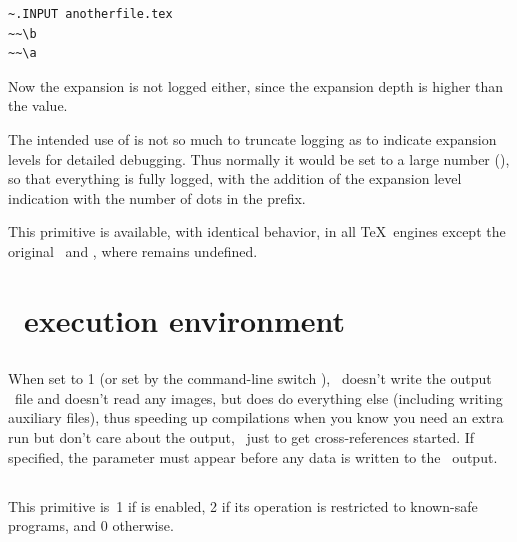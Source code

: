 \documentclass{pdftexmanual}
\begin{document}
\begin{verbatim}
~.INPUT anotherfile.tex
~~\b 
~~\a 
\end{verbatim}

Now the  expansion is not logged either, since the expansion
depth is higher than the  value.

The intended use of  is not so much to truncate
logging as to indicate expansion levels for detailed debugging. Thus
normally it would be set to a large number (), so that
everything is fully logged, with the addition of the expansion level
indication with the number of dots in the prefix.

This primitive is available, with identical behavior, in all \TeX\
engines except the original \TEX\ and \eTeX, where
 remains undefined. 

\section{\PDFTEX\ execution environment}

\subsection{}

When set to 1 (or set by the command-line switch ),
\PDFTEX\ doesn't write the output \PDF\ file and doesn't read any
images, but does do everything else (including writing auxiliary files),
thus speeding up compilations when you know you need an extra run but
don't care about the output, \eg\ just to get cross-references started.
If specified, the parameter must appear before any data is written to
the \PDF\ output. \introduced{1.40.0}

\subsection{}

This primitive is~1 if  is enabled, 2 if its operation is
restricted to known-safe programs, and 0 otherwise. 

\subsection{}
\end{document}
